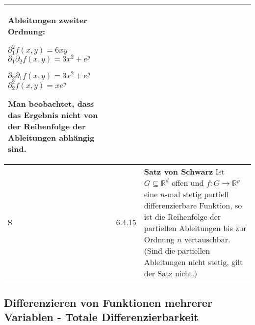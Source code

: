 \begin{longtable}{p{0.75cm} p{1cm} p{16cm}}
                        Ableitungen zweiter Ordnung: \hfill \break
                        \centerline{$\partial_1^2 f(x,y) =6xy$ \hspace{1cm} $\partial_1 \partial_2f(x,y) = 3x^2 + e^y $}
                        \centerline{$ \partial_2 \partial_1 f(x,y) = 3x^2 + e^y$ \hspace{1cm} $\partial_2^2f(x,y) = xe^y$} 
                        Man beobachtet, dass das Ergebnis nicht von der Reihenfolge der Ableitungen abhängig sind. \\
        \midrule
        S   & 6.4.15&   \textbf{Satz von Schwarz} \hfill \break
                        Ist $G \subseteq \mathbb{R}^d$ offen und $f: G \rightarrow \mathbb{R}^p$ eine $n$-mal stetig partiell differenzierbare Funktion,
                        so ist die Reihenfolge der partiellen Ableitungen bis zur Ordnung $n$ vertauschbar. \hfill \break
                        (Sind die partiellen Ableitungen nicht stetig, gilt der Satz nicht.)\\ 
        \bottomrule

    \end{longtable}

\subsection{Differenzieren von Funktionen mehrerer Variablen - Totale Differenzierbarkeit}

